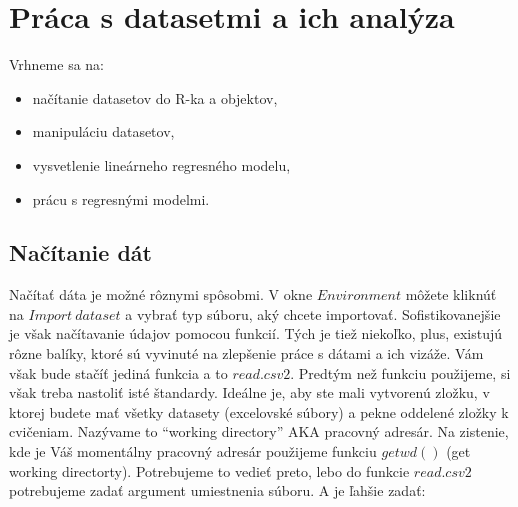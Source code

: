 \newpage

\hypertarget{pruxe1ca-s-datasetmi-a-ich-analuxfdza}{%
\section{Práca s datasetmi a ich
analýza}\label{pruxe1ca-s-datasetmi-a-ich-analuxfdza}}

Vrhneme sa na:

\begin{itemize}
\tightlist
\item
  načítanie datasetov do R-ka a objektov,
\item
  manipuláciu datasetov,
\item
  vysvetlenie lineárneho regresného modelu,
\item
  prácu s regresnými modelmi.
\end{itemize}

\hypertarget{naux10duxedtanie-duxe1t}{%
\subsection{Načítanie dát}\label{naux10duxedtanie-duxe1t}}

Načítať dáta je možné rôznymi spôsobmi. V okne \(Environment\) môžete
kliknúť na \(Import \ dataset\) a vybrať typ súboru, aký chcete
importovať. Sofistikovanejšie je však načítavanie údajov pomocou
funkcií. Tých je tiež niekoľko, plus, existujú rôzne balíky, ktoré sú
vyvinuté na zlepšenie práce s dátami a ich vizáže. Vám však bude stačíť
jediná funkcia a to \(read.csv2\). Predtým než funkciu použijeme, si
však treba nastoliť isté štandardy. Ideálne je, aby ste mali vytvorenú
zložku, v ktorej budete mať všetky datasety (excelovské súbory) a pekne
oddelené zložky k cvičeniam. Nazývame to ``working directory'' AKA
pracovný adresár. Na zistenie, kde je Váš momentálny pracovný adresár
použijeme funkciu \(getwd()\) (get working directorty). Potrebujeme to
vedieť preto, lebo do funkcie \(read.csv2\) potrebujeme zadať argument
umiestnenia súboru. A je ľahšie zadať:

\begin{Shaded}
\begin{Highlighting}[]
\NormalTok{(}\NormalTok{)}


\NormalTok{(}\NormalTok{)}
\end{Highlighting}
\end{Shaded}

